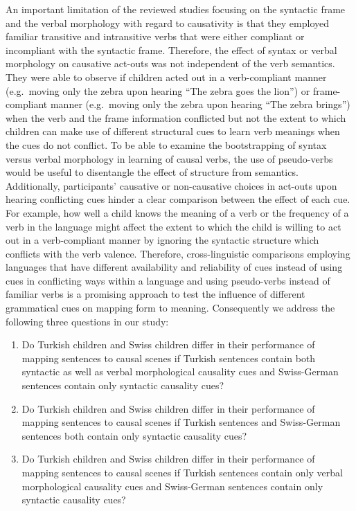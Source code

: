 \documentclass[man]{apa6}
\begin{document}
An important limitation of the reviewed studies focusing on the
syntactic frame and the verbal morphology with regard to causativity is
that they employed familiar transitive and intransitive verbs that were
either compliant or incompliant with the syntactic frame. Therefore, the
effect of syntax or verbal morphology on causative act-outs was not
independent of the verb semantics. They were able to observe if children
acted out in a verb-compliant manner (e.g.~moving only the zebra upon
hearing \enquote{The zebra goes the lion}) or frame-compliant manner
(e.g.~moving only the zebra upon hearing \enquote{The zebra brings})
when the verb and the frame information conflicted but not the extent to
which children can make use of different structural cues to learn verb
meanings when the cues do not conflict. To be able to examine the
bootstrapping of syntax versus verbal morphology in learning of causal
verbs, the use of pseudo-verbs would be useful to disentangle the effect of
structure from semantics. Additionally, participants' causative or
non-causative choices in act-outs upon hearing conflicting cues hinder a
clear comparison between the effect of each cue. For example, how well a
child knows the meaning of a verb or the frequency of a verb in the language
might affect the extent to which the child is willing to act out in a
verb-compliant manner by ignoring the syntactic structure which conflicts
with the verb valence. Therefore, cross-linguistic comparisons employing
languages that have different availability and reliability of cues instead
of using cues in conflicting ways within a language and using pseudo-verbs
instead of familiar verbs is a promising approach to test the influence
of different grammatical cues on mapping form to meaning. Consequently
we address the following three questions in our study:

\begin{enumerate}
\def\labelenumi{\arabic{enumi}.}
\item
  Do Turkish children and Swiss children differ in their performance of
  mapping sentences to causal scenes if Turkish sentences contain both
  syntactic as well as verbal morphological causality cues and
  Swiss-German sentences contain only syntactic causality cues?
\item
  Do Turkish children and Swiss children differ in their performance of
  mapping sentences to causal scenes if Turkish sentences and
  Swiss-German sentences both contain only syntactic causality cues?
\item
  Do Turkish children and Swiss children differ in their performance of
  mapping sentences to causal scenes if Turkish sentences contain only
  verbal morphological causality cues and Swiss-German sentences
  contain only syntactic causality cues?
\end{enumerate}
\end{document}
